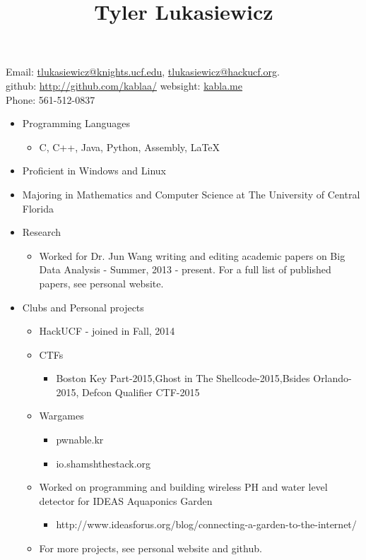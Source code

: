 \documentclass[font = 22]{article}
\title{Tyler Lukasiewicz}
\date{}
\begin{document}
\maketitle

\begin{center}
    Email: \quad \href{mailto:tlukasiewicz@knights.ucf.edu}{tlukasiewicz@knights.ucf.edu}, \href{mailto:tlukasiewicz@hackucf.org}{tlukasiewicz@hackucf.org}. \\
github: \url{http://github.com/kablaa/} \quad websight: \url{kabla.me} \\
Phone: 561-512-0837 
\end{center}




\begin{itemize}
    \item Programming Languages
        \begin{itemize}
            \item C, C++, Java, Python, Assembly, LaTeX
        \end{itemize}
    \item Proficient in Windows and Linux  
    \item Majoring in Mathematics and Computer Science at The University of Central Florida 
    \item Research 
    \begin{itemize}
        \item Worked for Dr. Jun Wang writing and editing academic papers on Big Data Analysis - Summer, 2013 - present. For a full list of published papers, see personal website.
    \end{itemize}
    
    \item Clubs and Personal projects
    \begin{itemize}
        \item HackUCF - joined in Fall, 2014
        \item  CTFs
        \begin{itemize}
            \item Boston Key Part-2015,Ghost in The Shellcode-2015,Bsides Orlando-2015, Defcon Qualifier CTF-2015
        \end{itemize}
        \item Wargames
        \begin{itemize}
            \item pwnable.kr
            \item io.shamshthestack.org
        \end{itemize}
        \item Worked on programming and building wireless PH and water level detector for IDEAS Aquaponics Garden
        \begin{itemize}
            \item http://www.ideasforus.org/blog/connecting-a-garden-to-the-internet/
        \end{itemize}
        \item For more projects, see personal website and github.  
    \end{itemize}


\end{itemize}
\end{document}
